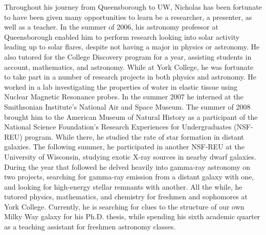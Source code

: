 \documentclass[12pt]{article}
\begin{document}
Throughout his journey from Queensborough to UW, Nicholas has been fortunate to have been given many opportunities to learn be a researcher, a presenter, as well as a teacher. In the summer of 2006, his astronomy professor at Queensborough enabled him to perform research looking into solar activity leading up to solar flares, despite not having a major in physics or astronomy. He also tutored for the College Discovery program for a year, assisting students in account, mathematics, and astronomy. While at York College, he was fortunate to take part in a number of research projects in both physics and astronomy. He worked in a lab investigating the properties of water in elastic tissue using Nuclear Magnetic Resonance probes. In the summer 2007 he interned at the Smithsonian Institute's National Air and Space Museum. The summer of 2008 brought him to the American Museum of Natural History as a participant of the National Science Foundation's Research Experiences for Undergraduates (NSF-REU) program. While there, he studied the rate of star formation in distant galaxies. The following summer, he participated in another NSF-REU at the University of Wisconsin, studying exotic X-ray sources in nearby dwarf galaxies. During the year that followed he delved heavily into gamma-ray astronomy on two projects, searching for gamma-ray emission from a distant galaxy with one, and looking for high-energy stellar remnants with another. All the while, he tutored physics, mathematics, and chemistry for freshmen and sophomores at York College. Currently, he is searching for clues to the structure of our own Milky Way galaxy for his Ph.D. thesis, while spending his sixth academic quarter as a teaching assistant for freshmen astronomy classes. 
\end{document}
